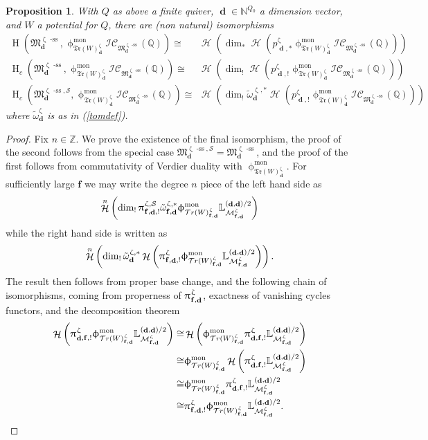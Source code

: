 \documentclass[a4paper,10pt]{amsart}
\renewcommand{\zeta}{\upzeta}
\renewcommand{\pi}{\uppi\hspace{0.05em}}
\renewcommand{\phi}{\upphi}
\newtheorem{proposition}[theorem]{Proposition}
\newcommand{\ff}{\mathbf{f}}
\newcommand{\LL}{\mathbb{L}}
\newcommand{\QQ}{\mathbb{Q}}
\newcommand{\SP}{\mathcal{S}}
\newcommand{\WW}{\mathcal{T}r(W)}
\newcommand{\WWW}{\mathfrak{Tr}(W)}
\newcommand{\Mst}{\mathfrak{M}}
\newcommand{\Msp}{\mathcal{M}}
\newcommand{\ICS}{\mathcal{IC}}
\newcommand{\phim}[1]{\phi^{\mon}_{#1}}
\DeclareMathOperator{\sst}{-ss}
\DeclareMathOperator{\mon}{mon}
\DeclareMathOperator{\dd}{\mathbf{d}}
\DeclareMathOperator{\Ho}{\mathcal{H}}
\DeclareMathOperator{\HO}{H}
\begin{document}
\begin{proposition}
\label{bcprop}
With $Q$ as above a finite quiver, $\dd\in\mathbb{N}^{Q_0}$ a dimension vector, and $W$ a potential for $Q$, there are (non natural) isomorphisms 
\begin{align*}
\HO\left(\Mst^{\zeta\sst}_{\dd},\phim{\WWW_{\dd}^{\zeta}}\ICS_{\Mst_{\dd}^{\zeta\sst}}(\mathbb{Q})\right)\cong& \Ho(\dim_*\Ho(p^{\zeta}_{\dd,*}\phim{\WWW_{\dd}^{\zeta}}\ICS_{\Mst_{\dd}^{\zeta\sst}}(\QQ)))\\
\HO_c\left(\Mst^{\zeta\sst}_{\dd},\phim{\WWW_{\dd}^{\zeta}}\ICS_{\Mst_{\dd}^{\zeta\sst}}(\mathbb{Q})\right)\cong& \Ho(\dim_!\Ho(p^{\zeta}_{\dd,!}\phim{\WWW_{\dd}^{\zeta}}\ICS_{\Mst_{\dd}^{\zeta\sst}}(\QQ)))\\
\HO_c\left(\Mst^{\zeta\sst,\SP}_{\dd},\phim{\WWW_{\dd}^{\zeta}}\ICS_{\Mst_{\dd}^{\zeta\sst}}(\mathbb{Q})\right)\cong&\Ho(\dim_!\tilde{\omega}_{\dd}^{\zeta,*}\Ho(p^{\zeta}_{\dd,!}\phim{\WWW_{\dd}^{\zeta}}\ICS_{\Mst_{\dd}^{\zeta\sst}}(\QQ)))
\end{align*}
where $\tilde{\omega}^{\zeta}_{\dd}$ is as in (\ref{tomdef}).
\end{proposition}
\begin{proof}
Fix $n\in\mathbb{Z}$.  We prove the existence of the final isomorphism, the proof of the second follows from the special case $\Mst^{\zeta\sst,\SP}_{\dd}=\Mst_{\dd}^{\zeta\sst}$, and the proof of the first follows from commutativity of Verdier duality with $\phim{\WWW^{\zeta}_{\dd}}$.  For sufficiently large $\ff$ we may write the degree $n$ piece of the left hand side as
\[
\Ho^n\left(\dim_!\pi^{\zeta,\SP}_{\ff,\dd,!}\tilde{\omega}_{\ff,\dd}^{\zeta,*}\phim{\WW^{\zeta}_{\ff,\dd}}\LL_{\Msp^{\zeta}_{\ff,\dd}}^{(\dd,\dd)/2}\right)
\]
while the right hand side is written as
\[
\Ho^n\left(\dim_!\tilde{\omega}^{\zeta,*}_{\dd}\Ho\left(\pi^{\zeta}_{\ff,\dd,!}\phim{\WW^{\zeta}_{\ff,\dd}}\LL_{\Msp^{\zeta}_{\ff,\dd}}^{(\dd,\dd)/2}\right)\right).
\]
The result then follows from proper base change, and the following chain of isomorphisms, coming from properness of $\pi^{\zeta}_{\ff,\dd}$, exactness of vanishing cycles functors, and the decomposition theorem
\begin{align*}
\Ho\left(\pi^{\zeta}_{\dd,\ff,!}\phim{\WW^{\zeta}_{\ff,\dd}}\LL_{\Msp^{\zeta}_{\ff,\dd}}^{(\dd,\dd)/2}\right)\cong&\Ho\left(\phim{\WW^{\zeta}_{\ff,\dd}}\pi^{\zeta}_{\dd,\ff,!}\LL_{\Msp^{\zeta}_{\ff,\dd}}^{(\dd,\dd)/2}\right)\\
\cong&\phim{\WW^{\zeta}_{\ff,\dd}}\Ho\left(\pi^{\zeta}_{\dd,\ff,!}\LL_{\Msp^{\zeta}_{\ff,\dd}}^{(\dd,\dd)/2}\right)\\
\cong&\phim{\WW^{\zeta}_{\ff,\dd}}\pi^{\zeta}_{\dd,\ff,!}\LL_{\Msp^{\zeta}_{\ff,\dd}}^{(\dd,\dd)/2}\\
\cong&\pi^{\zeta}_{\ff,\dd,!}\phim{\WW^{\zeta}_{\ff,\dd}}\LL_{\Msp^{\zeta}_{\ff,\dd}}^{(\dd,\dd)/2}.
\end{align*}
\end{proof}
\end{document}
